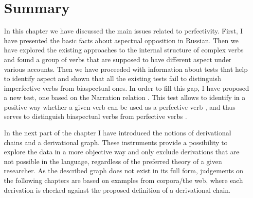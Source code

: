 \section{Summary}
In this chapter we have discussed the main issues related to perfectivity. First, I have presented the basic facts about aspectual opposition in Russian. Then we have explored the existing approaches to the internal structure of complex verbs  and found a group of verbs that are supposed to have different aspect under various accounts. Then we have proceeded with information about tests that help to identify aspect and shown that all the existing tests fail to distinguish imperfective verbs  from biaspectual ones. In order to fill this gap, I have proposed a new test, one based on the Narration relation . This test allows to identify in a positive way whether a given verb can be used as a perfective verb , and thus serves to distinguish biaspectual verbs  from perfective verbs .

In the next part of the chapter I have introduced the notions of derivational chains and a derivational graph. These instruments provide a possibility to explore the data in a more objective way and only exclude derivations that are not possible in the language, regardless of the preferred theory of a given researcher. As the described graph does not exist in its full form, judgements on the following chapters are based on examples from corpora/the web, where each derivation is checked against the proposed definition of a derivational chain.

